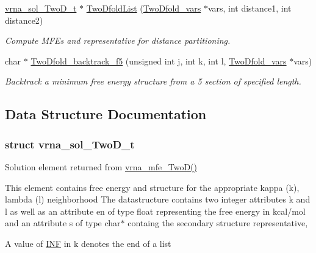 \begin{DoxyCompactItemize}
\hyperlink{group__kl__neighborhood__mfe_structvrna__sol__TwoD__t}{vrna\+\_\+sol\+\_\+\+Two\+D\+\_\+t} $\ast$ \hyperlink{group__kl__neighborhood__mfe_ga7fc5e3e92fe97914ca4eccd33c01c2a7}{Two\+Dfold\+List} (\hyperlink{group__kl__neighborhood__mfe_structTwoDfold__vars}{Two\+Dfold\+\_\+vars} $\ast$vars, int distance1, int distance2)
\begin{DoxyCompactList}\small\item\em Compute M\+FE\textquotesingle{}s and representative for distance partitioning. \end{DoxyCompactList}\item 
char $\ast$ \hyperlink{group__kl__neighborhood__mfe_gaf4dc05bf8fc1ea53acd7aeb798ba80c2}{Two\+Dfold\+\_\+backtrack\+\_\+f5} (unsigned int j, int k, int l, \hyperlink{group__kl__neighborhood__mfe_structTwoDfold__vars}{Two\+Dfold\+\_\+vars} $\ast$vars)
\begin{DoxyCompactList}\small\item\em Backtrack a minimum free energy structure from a 5\textquotesingle{} section of specified length. \end{DoxyCompactList}\end{DoxyCompactItemize}


\subsection{Data Structure Documentation}
\label{structvrna__sol__TwoD__t}
\subsubsection{struct vrna\+\_\+sol\+\_\+\+Two\+D\+\_\+t}
Solution element returned from \hyperlink{group__kl__neighborhood__mfe_ga243c288b463147352829df04de6a2f77}{vrna\+\_\+mfe\+\_\+\+Two\+D()} 

This element contains free energy and structure for the appropriate kappa (k), lambda (l) neighborhood The datastructure contains two integer attributes \textquotesingle{}k\textquotesingle{} and \textquotesingle{}l\textquotesingle{} as well as an attribute \textquotesingle{}en\textquotesingle{} of type float representing the free energy in kcal/mol and an attribute \textquotesingle{}s\textquotesingle{} of type char$\ast$ containg the secondary structure representative,

A value of \hyperlink{constants_8h_a12c2040f25d8e3a7b9e1c2024c618cb6}{I\+NF} in k denotes the end of a list

